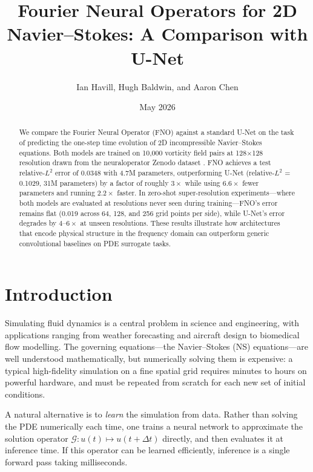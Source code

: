 \documentclass[sigconf,nonacm]{acmart}
\title{Fourier Neural Operators for 2D Navier--Stokes: A Comparison with U-Net}
\author{Ian Havill, Hugh Baldwin, and Aaron Chen}
\affiliation{\institution{Occidental College}\city{Los Angeles}\state{CA}\country{USA}}
\date{May 2026}
\begin{document}
\begin{abstract}
We compare the Fourier Neural Operator (FNO) \cite{li2021fno} against a standard
U-Net \cite{ronneberger2015unet} on the task of predicting the one-step time
evolution of 2D incompressible Navier--Stokes equations.
Both models are trained on 10{,}000 vorticity field pairs at 128$\times$128
resolution drawn from the neuraloperator Zenodo dataset \cite{zenodo2024}.
FNO achieves a test relative-$L^2$ error of 0.0348 with 4.7M parameters,
outperforming U-Net (relative-$L^2$ = 0.1029, 31M parameters) by a factor of
roughly $3\times$ while using $6.6\times$ fewer parameters and running $2.2\times$
faster.
In zero-shot super-resolution experiments---where both models are evaluated at
resolutions never seen during training---FNO's error remains flat (0.019 across
64, 128, and 256 grid points per side), while U-Net's error degrades by
$4$--$6\times$ at unseen resolutions.
These results illustrate how architectures that encode physical structure in the
frequency domain can outperform generic convolutional baselines on PDE surrogate
tasks.
\end{abstract}

\maketitle

\section{Introduction}
\label{sec:intro}

Simulating fluid dynamics is a central problem in science and engineering, with
applications ranging from weather forecasting and aircraft design to biomedical
flow modelling.
The governing equations---the Navier--Stokes (NS) equations---are well understood
mathematically, but numerically solving them is expensive: a typical high-fidelity
simulation on a fine spatial grid requires minutes to hours on powerful hardware,
and must be repeated from scratch for each new set of initial conditions.

A natural alternative is to \emph{learn} the simulation from data.
Rather than solving the PDE numerically each time, one trains a neural network to
approximate the solution operator $\mathcal{G}: u(t) \mapsto u(t + \Delta t)$
directly, and then evaluates it at inference time.
If this operator can be learned efficiently, inference is a single forward pass
taking milliseconds.
\end{document}
